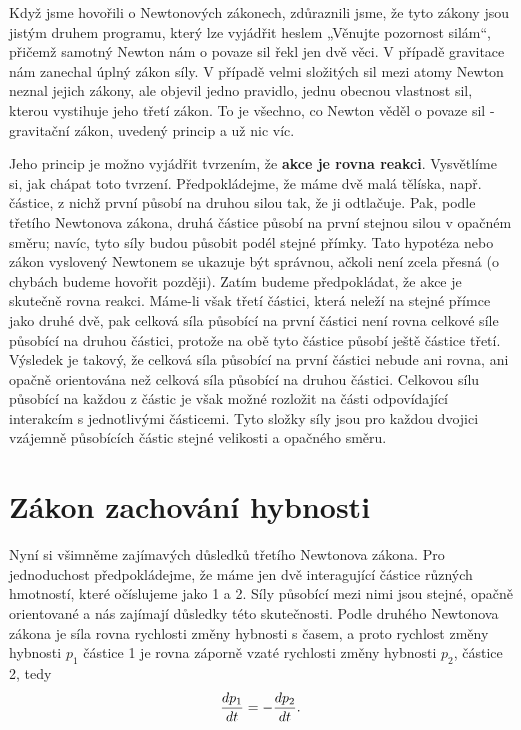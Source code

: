     Když jsme hovořili o Newtonových zákonech, zdůraznili jsme, že tyto zákony jsou jistým druhem 
    programu, který lze vyjádřit heslem „Věnujte pozornost silám“, přičemž samotný Newton nám o 
    povaze sil řekl jen dvě věci. V případě gravitace nám zanechal úplný zákon síly. V případě 
    velmi složitých sil mezi atomy Newton neznal jejich zákony, ale objevil jedno pravidlo, jednu 
    obecnou vlastnost sil, kterou vystihuje jeho třetí zákon. To je všechno, co Newton věděl o 
    povaze sil - gravitační zákon, uvedený princip a už nic víc.
    
    Jeho princip je možno vyjádřit tvrzením, že \textbf{akce je rovna reakci}. Vysvětlíme si, jak 
    chápat toto tvrzení. Předpokládejme, že máme dvě malá tělíska, např. částice, z nichž první 
    působí na druhou silou tak, že ji odtlačuje. Pak, podle třetího Newtonova zákona, druhá částice 
    působí na první stejnou silou v opačném směru; navíc, tyto síly budou působit podél stejné 
    přímky. Tato hypotéza nebo zákon vyslovený Newtonem se ukazuje být správnou, ačkoli není zcela 
    přesná (o chybách budeme hovořit později). Zatím budeme předpokládat, že akce je skutečně rovna 
    reakci. Máme-li však třetí částici, která neleží na stejné přímce jako druhé dvě, pak celková 
    síla působící na první částici není rovna celkové síle působící na druhou částici, protože na 
    obě tyto částice působí ještě částice třetí. Výsledek je takový, že celková síla působící na 
    první částici nebude ani rovna, ani opačně orientována než celková síla působící na druhou 
    částici. Celkovou sílu působící na každou z částic je však možné rozložit na části odpovídající 
    interakcím s jednotlivými částicemi. Tyto složky síly jsou pro každou dvojici vzájemně 
    působících částic stejné velikosti a opačného směru.
    
  \section{Zákon zachování hybnosti}
    Nyní si všimněme zajímavých důsledků třetího Newtonova zákona. Pro jednoduchost předpokládejme, 
    že máme jen dvě interagující částice různých hmotností, které očíslujeme jako 1 a 2. Síly 
    působící mezi nimi jsou stejné, opačně orientované a nás zajímají důsledky této skutečnosti. 
    Podle druhého Newtonova zákona je síla rovna rychlosti změny hybnosti s časem, a proto rychlost 
    změny hybnosti \(p_1\)  částice 1 je rovna záporně vzaté rychlosti změny hybnosti \(p_2\), 
    částice 2, tedy
    \begin{equation}\label{fyz:eq136}
      \dfrac{d p_1}{d t} = - \dfrac{d p_2}{d t}.
    \end{equation}
    
